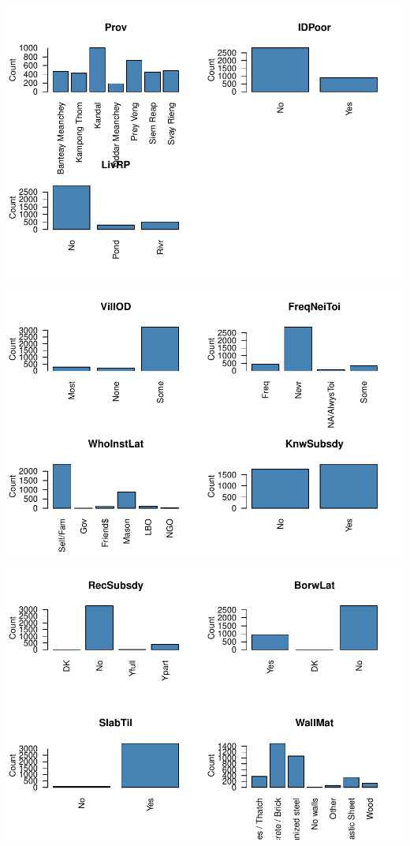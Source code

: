 \documentclass[11pt,]{article}
\begin{document}
\includegraphics{describe_FSMintentions_regional_seasonal_iDE-Camb_surveysOct2017_files/figure-latex/MCA_setup-1.pdf}
\includegraphics{describe_FSMintentions_regional_seasonal_iDE-Camb_surveysOct2017_files/figure-latex/MCA_setup-2.pdf}
\includegraphics{describe_FSMintentions_regional_seasonal_iDE-Camb_surveysOct2017_files/figure-latex/MCA_setup-3.pdf}
\end{document}
